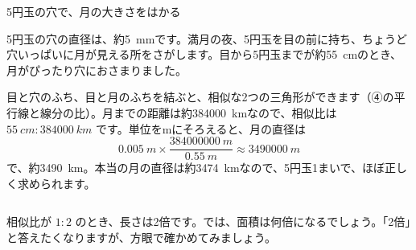 \begin{column}{5円玉の穴で、月の大きさをはかる}
\noindent\begin{minipage}[c]{0.6\linewidth}\raggedright
5円玉の穴の直径は、約\qty{5}{mm}です。満月の夜、5円玉を目の前に持ち、ちょうど穴いっぱいに月が見える所をさがします。目から5円玉までが約\qty{55}{cm}のとき、月がぴったり穴におさまりました。

目と穴のふち、目と月のふちを結ぶと、相似な2つの三角形ができます（④の平行線と線分の比）。月までの距離は約\qty{384000}{km}なので、相似比は $\qty{55}{cm}:\qty{384000}{km}$ です。単位をmにそろえると、月の直径は
\[ \qty{0.005}{m}\times\frac{\qty{384000000}{m}}{\qty{0.55}{m}}\approx\qty{3490000}{m} \]
で、約\qty{3490}{km}。本当の月の直径は約\qty{3474}{km}なので、5円玉1まいで、ほぼ正しく求められます。
\end{minipage}\hfill
\begin{minipage}[c]{0.36\linewidth}\centering
{}
\end{minipage}
\end{column}


\leavevmode\label{bk:4-3:menseki}相似比が $1:2$ のとき、長さは2倍です。では、面積は何倍になるでしょう。「2倍」と答えたくなりますが、方眼で確かめてみましょう。

